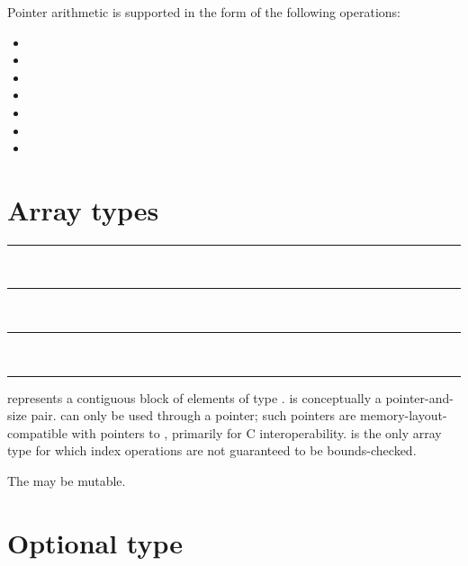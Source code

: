 \begin{samepage}
Pointer arithmetic is supported in the form of the following operations:

\begin{itemize}
\item {} \code{+} 
\item {} \code{+=} 
\item {} \code{++}
\item {} \code{-} 
\item {} \code{-=} 
\item {} \code{--}
\item {} \code{-} 
\end{itemize}
\end{samepage}

\section{Array types}

\begin{grammar}
\rule{array-type-with-constant-size}  \code{[}  \code{]}\\
\rule{array-type-with-runtime-size}  \code{[} \code{]}\\
\rule{array-type-with-unknown-size}  \code{[}  \code{]}\\
\rule{element-type} 
\end{grammar}

 represents a contiguous block of
 elements of type .
 is conceptually a pointer-and-size
pair.  can only be used through a
pointer; such pointers are memory-layout-compatible with pointers to
, primarily for C interoperability.
 is the only array type for which
index operations are not guaranteed to be bounds-checked.

The  may be mutable.

\section{Optional type}

